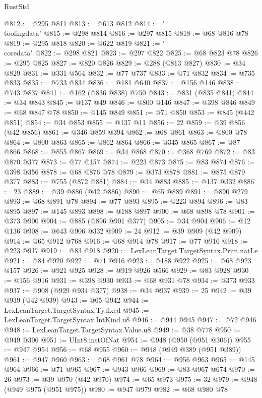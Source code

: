 \begin{lexlean}{RustStd}
\begin{coremodule}
{{@812 := @295 @811
@813 := @613 @812
@814 := "\\toolingdata"
@815 := @298 @814
@816 := @297 @815
@818 := @68 @816 @78
@819 := @295 @818
@820 := @622 @819
@821 := "\\coredata"
@822 := @298 @821
@823 := @297 @822
@825 := @68 @823 @78
@826 := @295 @825
@827 := @820 @826
@829 := @288 (@813 @827)
@830 := @34 @829
@831 := @331 @564
@832 := @77 @737
@833 := @71 @832
@834 := @735 @833
@835 := @733 @834
@836 := @181 @640
@837 := @156 @146
@838 := @743 @837
@841 := @162 (@836 @838) @750
@843 := @831 (@835 @841)
@844 := @34 @843
@845 := @137 @49
@846 := @800 @146
@847 := @398 @846
@849 := @68 @847 @78
@850 := @145 @849
@851 := @71 @850
@853 := @845 (@442 @851)
@854 := @34 @853
@855 := @137 @11
@856 := 22
@859 := @39 @856 (@42 @856)
@861 := @346 @859 @394
@862 := @68 @861
@863 := @800 @78
@864 := @800 @863
@865 := @862 @864
@866 := @345 @865
@867 := @87 @866
@868 := @855 @867
@869 := @34 @868
@870 := @368 @769
@872 := @83 @870 @377
@873 := @77 @157
@874 := @223 @873
@875 := @83 @874
@876 := @398 @356
@878 := @68 @876 @78
@879 := @373 @878
@881 := @875 @879 @377
@883 := @755 (@872 @881)
@884 := @34 @883
@885 := @137 @332
@886 := 23
@889 := @39 @886 (@42 @886)
@890 := @65 @889
@891 := @890 @279
@893 := @68 @891 @78
@894 := @77 @893
@895 := @223 @894
@896 := @83 @895
@897 := @145 @893
@898 := @188 @897
@900 := @68 @898 @78
@901 := @373 @900
@904 := @885 (@896 @901 @377)
@905 := @34 @904
@906 := @12 @136
@908 := @643 @906 @332
@909 := 24
@912 := @39 @909 (@42 @909)
@914 := @65 @912 @768
@916 := @68 @914 @78
@917 := @77 @916
@918 := @223 @917
@919 := @83 @918
@920 := LexLeanTarget.TargetSyntax.Prim.natLe
@921 := @84 @920
@922 := @71 @916
@923 := @188 @922
@925 := @68 @923 @157
@926 := @921 @925
@928 := @919 @926 @566
@929 := @83 @928
@930 := @156 @916
@931 := @398 @930
@933 := @68 @931 @78
@934 := @373 @933
@937 := @908 (@929 @934 @377)
@938 := @34 @937
@939 := 25
@942 := @39 @939 (@42 @939)
@943 := @65 @942
@944 := LexLeanTarget.TargetSyntax.Ty.fixed
@945 := LexLeanTarget.TargetSyntax.IntKind.u8
@946 := @944 @945
@947 := @72 @946
@948 := LexLeanTarget.TargetSyntax.Value.u8
@949 := @38 @778
@950 := @949 @306
@951 := UInt8.instOfNat
@954 := @948 (@950 (@951 @306))
@955 := @947 @954
@956 := @68 @955
@960 := @948 (@949 @389 (@951 @389))
@961 := @947 @960
@963 := @68 @961 @78
@964 := @956 @963
@965 := @145 @964
@966 := @71 @965
@967 := @943 @966
@969 := @83 @967 @674
@970 := 26
@973 := @39 @970 (@42 @970)
@974 := @65 @973
@975 := 32
@979 := @948 (@949 @975 (@951 @975))
@980 := @947 @979
@982 := @68 @980 @78
}}
\end{coremodule}
\end{lexlean}
